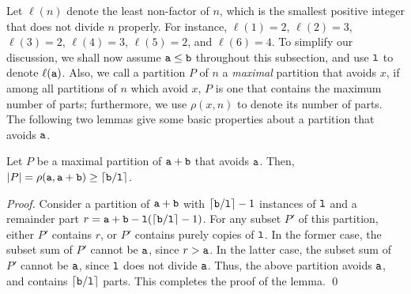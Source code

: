 \noindent
Let $\ell(n)$ denote the least non-factor of $n$, which is the smallest positive integer that does not divide $n$ properly.
For instance, $\ell(1) = 2$, $\ell(2) = 3$, $\ell(3) = 2$, $\ell(4) = 3$, $\ell(5) = 2$, and $\ell(6) = 4$.  
To simplify our discussion, we shall now assume $\mathtt{a} \leq \mathtt{b}$ throughout this subsection, and use $\mathtt{l}$ to denote $\ell(\mathtt{a})$.
Also, we call a partition $P$ of $n$ a \emph{maximal} partition that avoids $x$, if among all partitions of $n$ 
which avoid $x$, $P$ is one that contains the maximum number of parts;  furthermore, we use $\rho(x, n)$ to denote its number of parts.
The following two lemmas give some basic properties about a partition that avoids $\mathtt{a}$.

\begin{lemma} \label{lem:at-least-b/L}
Let $P$ be a maximal partition of $\mathtt{a} + \mathtt{b}$ that avoids $\mathtt{a}$.  
Then, $|P| = \rho(\mathtt{a}, \mathtt{a}+\mathtt{b}) \geq \left \lceil \mathtt{b}/\mathtt{l} \right \rceil$.
\end{lemma} 
\begin{proof}
Consider a partition of $\mathtt{a}+\mathtt{b}$ with $\left \lceil \mathtt{b}/\mathtt{l} \right \rceil-1$ instances of $\mathtt{l}$ and a remainder part $r = \mathtt{a}+\mathtt{b}-\mathtt{l}(\left \lceil \mathtt{b}/\mathtt{l} \right \rceil-1)$.  
For any subset $P'$ of this partition, either $P'$ contains $r$, or $P'$ contains purely copies of $\mathtt{l}$.  
In the former case, the subset sum of $P'$ cannot be $\mathtt{a}$, since $r > \mathtt{a}$. 
In the latter case, the subset sum of $P'$ cannot be $\mathtt{a}$, since $\mathtt{l}$ does not divide $\mathtt{a}$.
Thus, the above partition avoids $\mathtt{a}$, and contains $\left \lceil \mathtt{b}/\mathtt{l} \right \rceil$ parts.   
This completes the proof of the lemma.
\qed
\end{proof}

